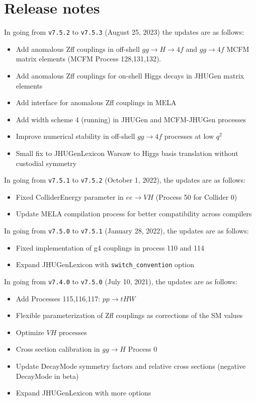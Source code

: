 \documentclass[aps,superscriptaddress,nofootinbib]{revtex4}
\begin{document}
\section{Release notes}
\noindent 
In going from \verb|v7.5.2| to \verb|v7.5.3| (August 25, 2023) the updates are as follows:
\noindent
\begin{itemize}
\item Add anomalous Zff couplings in off-shell $gg\to H \to 4f$ and $gg \to 4f$ MCFM matrix elements (MCFM Process 128,131,132).
\item Add anomalous Zff couplings for on-shell Higgs decays in JHUGen matrix elements
\item Add interface for anomalous Zff couplings in MELA
\item Add width scheme 4 (running) in JHUGen and MCFM-JHUGen processes
\item Improve numerical stability in off-shell $gg \to 4f$ processes at low $q^2$ 
\item Small fix to JHUGenLexicon Warsaw to Higgs basis translation without custodial symmetry
\end{itemize}
\noindent 
In going from \verb|v7.5.1| to \verb|v7.5.2| (October 1, 2022), the updates are as follows:
\noindent
\begin{itemize}
\item Fixed ColliderEnergy parameter in $ee\to VH$ (Process 50 for Collider 0)
\item Update MELA compilation process for better compatibility across compilers
\end{itemize}
In going from \verb|v7.5.0| to \verb|v7.5.1| (January 28, 2022), the updates are as follows:
\noindent
\begin{itemize}
\item Fixed implementation of g4 couplings in process 110 and 114 
\item Expand JHUGenLexicon with \verb|switch_convention| option
\end{itemize}
In going from \verb|v7.4.0| to \verb|v7.5.0| (July 10, 2021), the updates are as follows:
\begin{itemize}
\item Add Processes 115,116,117: $pp\to tHW$
\item Flexible parameterization of Zff couplings as corrections of the SM values 
\item Optimize $VH$ processes 
\item Cross section calibration in $gg\to H$ Process 0
\item Update DecayMode symmetry factors and relative cross sections (negative DecayMode in beta)
\item Expand JHUGenLexicon with more options 
\end{itemize}
\end{document}
